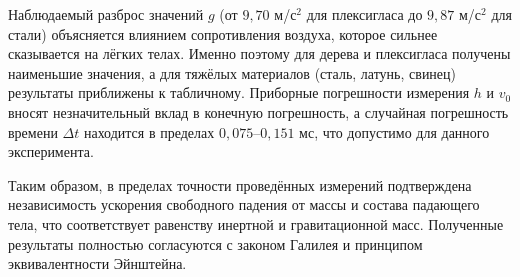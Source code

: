 \documentclass[a4paper,14pt]{extarticle}
\theoremstyle{plain}
\theoremstyle{remark}
\theoremstyle{definition}
\begin{document}
Наблюдаемый разброс значений $g$ (от $9,70$ м/с$^2$ для плексигласа до $9,87$ м/с$^2$ для стали) объясняется влиянием сопротивления воздуха, которое сильнее сказывается на лёгких телах. Именно поэтому для дерева и плексигласа получены наименьшие значения, а для тяжёлых материалов (сталь, латунь, свинец) результаты приближены к табличному. Приборные погрешности измерения $h$ и $v_0$ вносят незначительный вклад в конечную погрешность, а случайная погрешность времени $\Delta t$ находится в пределах $0,075$–$0,151$ мс, что допустимо для данного эксперимента.

Таким образом, в пределах точности проведённых измерений подтверждена независимость ускорения свободного падения от массы и состава падающего тела, что соответствует равенству инертной и гравитационной масс. Полученные результаты полностью согласуются с законом Галилея и принципом эквивалентности Эйнштейна.

\clearpage
\appendix
\end{document}
